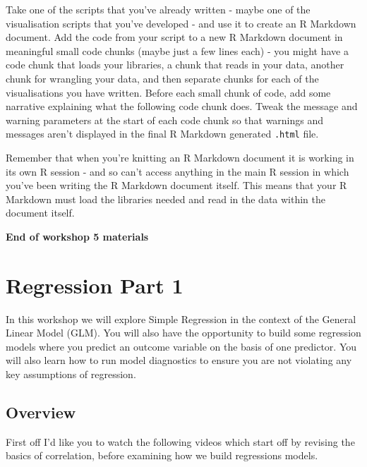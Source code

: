 \documentclass[
]{book}
\begin{document}
Take one of the scripts that you've already written - maybe one of the visualisation scripts that you've developed - and use it to create an R Markdown document. Add the code from your script to a new R Markdown document in meaningful small code chunks (maybe just a few lines each) - you might have a code chunk that loads your libraries, a chunk that reads in your data, another chunk for wrangling your data, and then separate chunks for each of the visualisations you have written. Before each small chunk of code, add some narrative explaining what the following code chunk does. Tweak the message and warning parameters at the start of each code chunk so that warnings and messages aren't displayed in the final R Markdown generated \texttt{.html} file.

Remember that when you're knitting an R Markdown document it is working in its own R session - and so can't access anything in the main R session in which you've been writing the R Markdown document itself. This means that your R Markdown must load the libraries needed and read in the data within the document itself.

\textbf{End of workshop 5 materials}

\hypertarget{regression-part-1}{%
\chapter{Regression Part 1}\label{regression-part-1}}

In this workshop we will explore Simple Regression in the context of the General Linear Model (GLM). You will also have the opportunity to build some regression models where you predict an outcome variable on the basis of one predictor. You will also learn how to run model diagnostics to ensure you are not violating any key assumptions of regression.

\hypertarget{overview-1}{%
\section{Overview}\label{overview-1}}

First off I'd like you to watch the following videos which start off by revising the basics of correlation, before examining how we build regressions models.

~~

~~

~~

~~

~~
\end{document}
